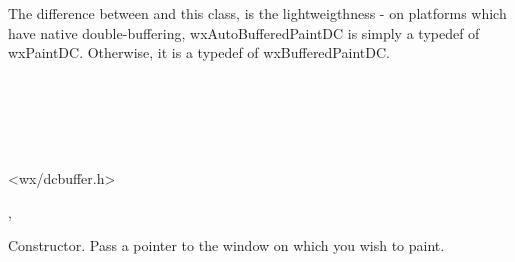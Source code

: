 The difference between  and this class,
is the lightweigthness - on platforms which have native double-buffering, wxAutoBufferedPaintDC is simply
a typedef of wxPaintDC. Otherwise, it is a typedef of wxBufferedPaintDC.



\\
\\
\\
\\


<wx/dcbuffer.h>


,\rtfsp
{}



\label{wxautobufferedpaintdcctor}


Constructor. Pass a pointer to the window on which you wish to paint.

